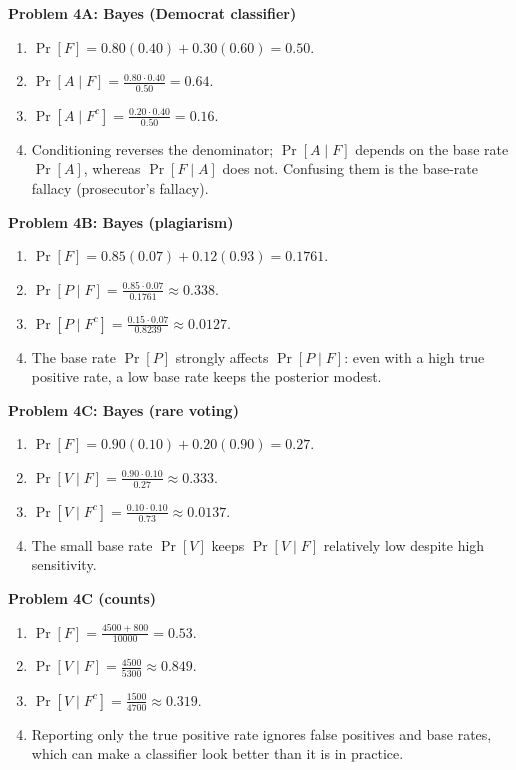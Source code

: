 \documentclass[12pt]{article}
\begin{document}
\vspace{0.5em}
\noindent\textbf{Problem 4A: Bayes (Democrat classifier)}
\begin{enumerate}[label=\arabic*\alph*)]
  \item $\Pr[F]=0.80(0.40)+0.30(0.60)=0.50$.
  \item $\Pr[A\mid F]=\frac{0.80\cdot0.40}{0.50}=0.64$.
  \item $\Pr[A\mid F^c]=\frac{0.20\cdot0.40}{0.50}=0.16$.
  \item Conditioning reverses the denominator; $\Pr[A\mid F]$ depends on the base rate $\Pr[A]$, whereas $\Pr[F\mid A]$ does not. Confusing them is the base-rate fallacy (prosecutor's fallacy).
\end{enumerate}

\vspace{0.5em}
\noindent\textbf{Problem 4B: Bayes (plagiarism)}
\begin{enumerate}[label=\arabic*\alph*)]
  \item $\Pr[F]=0.85(0.07)+0.12(0.93)=0.1761$.
  \item $\Pr[P\mid F]=\frac{0.85\cdot0.07}{0.1761}\approx0.338$.
  \item $\Pr[P\mid F^c]=\frac{0.15\cdot0.07}{0.8239}\approx0.0127$.
  \item The base rate $\Pr[P]$ strongly affects $\Pr[P\mid F]$: even with a high true positive rate, a low base rate keeps the posterior modest.
\end{enumerate}

\vspace{0.5em}
\noindent\textbf{Problem 4C: Bayes (rare voting)}
\begin{enumerate}[label=\arabic*\alph*)]
  \item $\Pr[F]=0.90(0.10)+0.20(0.90)=0.27$.
  \item $\Pr[V\mid F]=\frac{0.90\cdot0.10}{0.27}\approx0.333$.
  \item $\Pr[V\mid F^c]=\frac{0.10\cdot0.10}{0.73}\approx0.0137$.
  \item The small base rate $\Pr[V]$ keeps $\Pr[V\mid F]$ relatively low despite high sensitivity.
\end{enumerate}

\vspace{0.5em}
\noindent\textbf{Problem 4C (counts)}
\begin{enumerate}[label=\arabic*\alph*)]
  \item $\Pr[F]=\frac{4500+800}{10000}=0.53$.
  \item $\Pr[V\mid F]=\frac{4500}{5300}\approx0.849$.
  \item $\Pr[V\mid F^c]=\frac{1500}{4700}\approx0.319$.
  \item Reporting only the true positive rate ignores false positives and base rates, which can make a classifier look better than it is in practice.
\end{enumerate}
\end{document}
